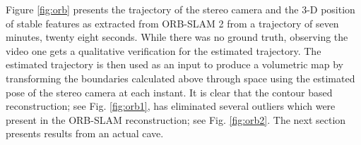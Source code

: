 Figure \ref{fig:orb} presents the trajectory of the stereo camera and the 3\hyp D position of stable features as extracted from ORB\hyp SLAM 2 from a trajectory of seven minutes, twenty eight seconds. While there was no ground truth, observing the video one gets a qualitative verification for the estimated trajectory. The estimated trajectory is then used as an input to produce a volumetric map by transforming the boundaries calculated above through space using the estimated pose of the stereo camera at each instant. It is clear that the contour based reconstruction; see Fig. \ref{fig:orb1}, has eliminated several outliers which were present in the ORB-SLAM reconstruction; see Fig. \ref{fig:orb2}. The next section presents results from an actual cave.